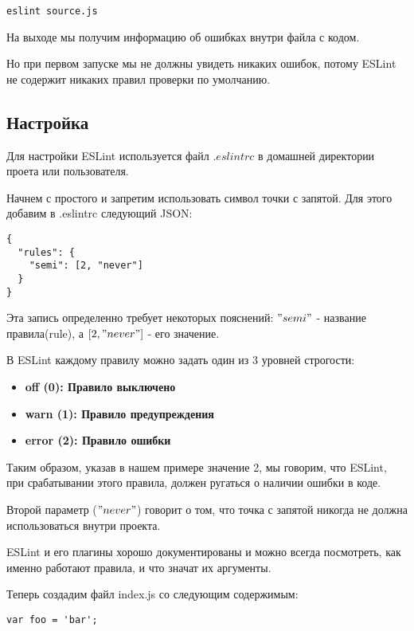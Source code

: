 \documentclass[12pt]{book}
\begin{document}
\begin{lstlisting}
eslint source.js
\end{lstlisting}

На выходе мы получим информацию об ошибках внутри файла с кодом.

Но при первом запуске мы не должны увидеть никаких ошибок, потому ESLint не содержит никаких правил проверки по умолчанию.

\subsection*{Настройка}

Для настройки ESLint используется файл $.eslintrc$ в домашней директории проета или пользователя.

Начнем с простого и запретим использовать символ точки с запятой. Для этого добавим в .eslintrc следующий JSON:

\begin{lstlisting}
{
  "rules": {
    "semi": [2, "never"]
  } 
}
\end{lstlisting}

Эта запись определенно требует некоторых пояснений: $"semi"$ - название правила(rule), а $[2, "never"]$ - его значение. 

В ESLint каждому правилу можно задать один из 3 уровней строгости:

\begin{itemize}
  \item \textbf{off (0): Правило выключено}
  \item \textbf{warn (1): Правило предупреждения}
  \item \textbf{error (2): Правило ошибки}
\end{itemize}

Таким образом, указав в нашем примере значение 2, мы говорим, что ESLint, при срабатывании этого правила, должен ругаться о наличии ошибки в коде.

Второй параметр ($"never"$) говорит о том, что точка с запятой никогда не должна использоваться внутри проекта.

ESLint и его плагины хорошо документированы и можно всегда посмотреть, как именно работают правила, и что значат их аргументы.

Теперь создадим файл index.js со следующим содержимым:

\begin{lstlisting}
var foo = 'bar';
\end{lstlisting}
\end{document}
